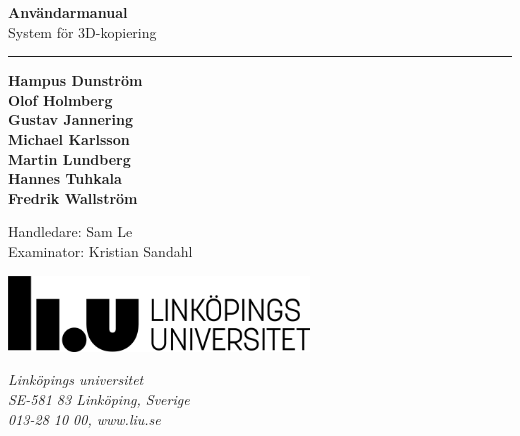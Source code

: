 \documentclass[a4paper,titlepage,12pt]{article}
\begin{document}
\begin{titlepage}

\vspace*{\fill}
\huge
\textbf{Användarmanual} \\
\Large
System för 3D-kopiering \\
\noindent\rule{17cm}{0.4pt}
\bigskip

\small
\textbf{Hampus Dunström \\
Olof Holmberg \\
Gustav Jannering \\
Michael Karlsson \\
Martin Lundberg \\
Hannes Tuhkala \\
Fredrik Wallström}
\bigskip
\bigskip

Handledare: Sam Le \\
Examinator: Kristian Sandahl

\date{\today}
\vspace*{\fill}

\vspace*{\fill}
\begin{minipage}[b]{0.7\textwidth}
	\includegraphics[width=8cm]{images/liu-logga.png}
\end{minipage}
\begin{minipage}[b]{0.4\textwidth}
	\normalsize
	\textit{Linköpings universitet} \\
	\textit{SE-581 83 Linköping, Sverige}\\
	\textit{013-28 10 00, www.liu.se}
\end{minipage}

\end{titlepage}
\newpage
\end{document}
